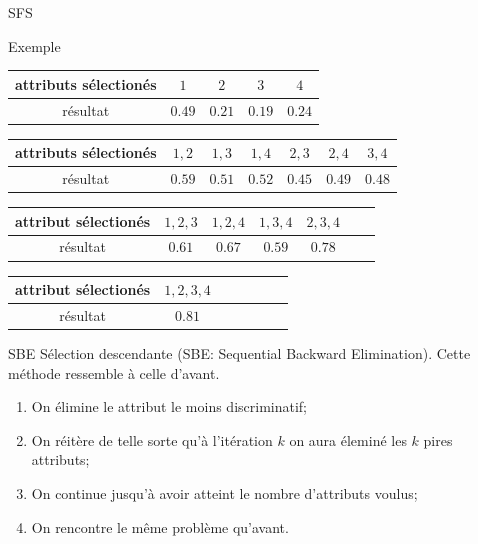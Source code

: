 \documentclass[8pt]{beamer}
\begin{document}
	\begin{frame}{SFS}
		\begin{block}{Exemple}
			\begin{center}
				\begin{longtable}{c c c c c}
					\toprule
					attributs sélectionés & $1$ & $2$ & $3$ & $4$\\
					\midrule
					résultat& \boldmath $0.49$ & $0.21$ & $0.19$ &$0.24$\\
					\bottomrule
				\end{longtable}
				\begin{longtable}{c c c c c c c}
					\toprule
					attributs sélectionés & $1,2$ & $1,3$ & $1,4$ & $2,3$ & $2,4$ & $3,4$\\
					\midrule
					résultat & \boldmath$0.59$ & $0.51$ & $0.52$ & $0.45$ & $0.49$ & $0.48$\\
					\bottomrule
				\end{longtable}
				\begin{longtable}{c c c c c c c}
					\toprule
					attribut sélectionés & $1,2,3$ & $1,2,4$ & $1,3,4$ & $2,3,4$\\
					\midrule
					résultat & $0.61$ & $0.67$ & $0.59$ & \boldmath$0.78$\\
					\bottomrule
				\end{longtable}
				\begin{longtable}{c c c c c c c}
				\toprule
				attribut sélectionés & $1,2,3,4$\\
				\midrule
				résultat & \boldmath$0.81$\\
				\bottomrule
			\end{longtable}
			\end{center}
		\end{block}
	\end{frame}

	\begin{frame}{SBE}
		Sélection descendante (SBE\@: Sequential Backward Elimination).
		Cette méthode ressemble à celle d'avant.
		\begin{enumerate}
		\item<1-> On élimine le attribut le moins discriminatif;
		\item<2-> On réitère  de telle sorte qu'à l'itération $k$ on aura éleminé les $k$ pires attributs;
		\item<3-> On continue jusqu'à avoir atteint le nombre d'attributs voulus;
		\item <4-> On rencontre le même problème qu'avant.
		\end{enumerate}
	\end{frame}
\end{document}

